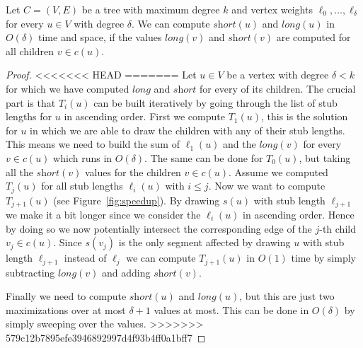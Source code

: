 \documentclass[a4paper,english,numberwithinsect]{eurocg18}
\newcommand{\fabian}[1]{\todo[inline,color=pink!40]{FK: #1}}
\newcommand{\sollong}{\ensuremath{\textit{long}}\xspace}
\newcommand{\solshort}{\ensuremath{\textit{short}}\xspace}
\begin{document}
\begin{lemma}
	\label{lem:compute_vertex}
	Let $ C = (V,E) $ be a tree with maximum degree $ k $ and vertex weights $ \ell_0,\dots,\ell_{\delta} $ for every $ u \in V $ with degree $ \delta $. We can compute $ \solshort(u) $ and $ \sollong(u) $ in $ O(\delta) $ time and space, if the values $ \sollong(v) $ and $ \solshort(v) $ are computed for all children $ v \in c(u) $.
\end{lemma}
\begin{proof}
<<<<<<< HEAD
	\fabian{todo}
=======
	Let $ u \in V $ be a vertex with degree $ \delta < k $ for which we have computed $ \sollong $ and $ \solshort $ for every of its children. The crucial part is that $ T_i(u) $ can be built iteratively by going through the list of stub lengths for $ u $ in ascending order. First we compute $ T_1(u) $, this is the solution for $ u $ in which we are able to draw the children with any of their stub lengths. This means we need to build the sum of $ \ell_1(u) $ and the $ \sollong(v) $ for every $ v \in c(u) $ which runs in $ O(\delta) $. The same can be done for $ T_0(u) $, but taking all the $ \solshort(v) $ values for the children $ v \in c(u) $. Assume we computed $ T_j(u) $ for all stub lengths $ \ell_i(u) $ with $ i \leq j $. Now we want to compute $ T_{j+1}(u) $ (see Figure~\ref{fig:speedup}). By drawing $ s(u) $ with stub length $ \ell_{j +1} $ we make it a bit longer since we consider the $ \ell_i(u) $ in ascending order. Hence by doing so we now potentially intersect the corresponding edge of the $ j $-th child $ v_j \in c(u) $. Since $ s(v_j) $ is the only segment affected by drawing $ u $ with stub length $ \ell_{j + 1} $ instead of $ \ell_j $ we can compute $ T_{j+1}(u) $ in $O(1)$ time by simply subtracting $ \sollong(v) $ and adding $ \solshort(v) $.
	
	Finally we need to compute $ \solshort(u) $ and $ \sollong(u) $, but this are just two maximizations over at most $ \delta + 1 $ values at most. This can be done in $ O(\delta) $ by simply sweeping over the values.
>>>>>>> 579c12b7895efe3946892997d4f93b4ff0a1bff7
\end{proof}
\end{document}
